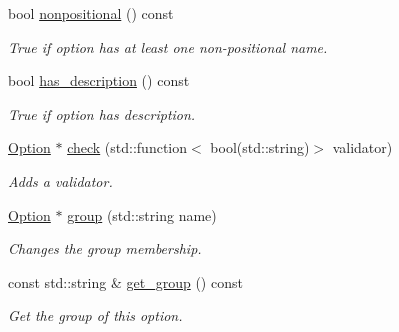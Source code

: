 \begin{DoxyCompactItemize}
\mbox{\label{class_c_l_i_1_1_option_a94cc5149d388be946c449e8ee61cd034}} 
bool \hyperlink{class_c_l_i_1_1_option_a94cc5149d388be946c449e8ee61cd034}{nonpositional} () const
\begin{DoxyCompactList}\small\item\em True if option has at least one non-\/positional name. \end{DoxyCompactList}\item 
\mbox{\label{class_c_l_i_1_1_option_a6770984498050b33659ce0c14b8f4696}} 
bool \hyperlink{class_c_l_i_1_1_option_a6770984498050b33659ce0c14b8f4696}{has\+\_\+description} () const
\begin{DoxyCompactList}\small\item\em True if option has description. \end{DoxyCompactList}\item 
\mbox{\label{class_c_l_i_1_1_option_a4dbdf09db906dda9417c80ee1676e0af}} 
\hyperlink{class_c_l_i_1_1_option}{Option} $\ast$ \hyperlink{class_c_l_i_1_1_option_a4dbdf09db906dda9417c80ee1676e0af}{check} (std\+::function$<$ bool(std\+::string)$>$ validator)
\begin{DoxyCompactList}\small\item\em Adds a validator. \end{DoxyCompactList}\item 
\mbox{\label{class_c_l_i_1_1_option_aab4b629426409424e9d852170ee18796}} 
\hyperlink{class_c_l_i_1_1_option}{Option} $\ast$ \hyperlink{class_c_l_i_1_1_option_aab4b629426409424e9d852170ee18796}{group} (std\+::string name)
\begin{DoxyCompactList}\small\item\em Changes the group membership. \end{DoxyCompactList}\item 
\mbox{\label{class_c_l_i_1_1_option_a5f6adbac10f12a3865e94d6ad59f2a83}} 
const std\+::string \& \hyperlink{class_c_l_i_1_1_option_a5f6adbac10f12a3865e94d6ad59f2a83}{get\+\_\+group} () const
\begin{DoxyCompactList}\small\item\em Get the group of this option. \end{DoxyCompactList}\item 

\end{DoxyCompactItemize}

